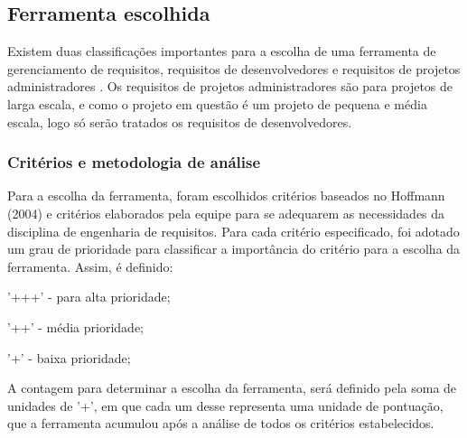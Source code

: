 \subsection{Ferramenta escolhida}

Existem duas classificações importantes para a escolha de uma ferramenta de gerenciamento de requisitos, requisitos de desenvolvedores e requisitos de projetos administradores \cite{hoffmann2004}. Os requisitos de projetos administradores são para projetos de larga escala, e como o projeto em questão é um projeto de pequena e média escala, logo só serão tratados os requisitos de desenvolvedores.

\subsubsection{Critérios e metodologia de análise}

Para a escolha da ferramenta, foram escolhidos critérios baseados no Hoffmann (2004) e critérios elaborados pela equipe para se adequarem as necessidades da disciplina de engenharia de requisitos.
Para cada critério especificado, foi adotado um grau de prioridade para classificar a importância do critério para a escolha da ferramenta. Assim, é definido: 
\begin{description}
    \item '+++' - para alta prioridade; 
    \item '++' - média prioridade; 
    \item '+' - baixa prioridade;
\end{description}

A contagem para determinar a escolha da ferramenta, será definido pela soma de unidades de '+', em que cada um desse representa uma unidade de pontuação, que a ferramenta acumulou após a análise de todos os critérios estabelecidos.

